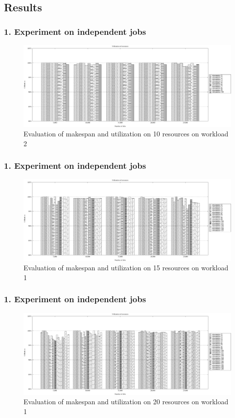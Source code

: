 \documentclass{beamer}
\begin{document}
\subsection*{Results}
\begin{frame}
\frametitle{1. Experiment on independent jobs}
\begin{figure}[!ht]
    \centering
    \includegraphics[width=1.02\textwidth,keepaspectratio]{imgs/10res_SHARCNET}
    \caption{Evaluation of makespan and utilization on 10 resources on workload 2}
    \label{fig:10res}
\end{figure}
\end{frame}

\begin{frame}
 \frametitle{1. Experiment on independent jobs}
\begin{figure}[h]
    \centering
    \includegraphics[width=1.02\textwidth,keepaspectratio]{imgs/15res_SHARCNET}
    \caption{Evaluation of makespan and utilization on 15 resources on workload 1}
    \label{fig:15res}
\end{figure}
\end{frame}

\begin{frame}
 \frametitle{1. Experiment on independent jobs}
\begin{figure}[h]
    \centering
    \includegraphics[width=1.02\textwidth,keepaspectratio]{imgs/20res_SHARCNET}
    \caption{Evaluation of makespan and utilization on 20 resources on workload 1}
    \label{fig:20res}
\end{figure}
\end{frame}
\end{document}
